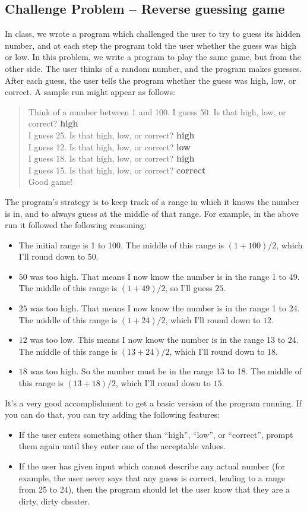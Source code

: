 \documentclass[11pt]{article}
\theoremstyle{plain}
\theoremstyle{definition}
\theoremstyle{remark}
\begin{document}
\subsection*{Challenge Problem -- Reverse guessing game}
In class, we wrote a program which challenged the user to try to guess its
hidden number, and at each step the program told the user whether the guess was
high or low. In this problem, we write a program to play the same game, but from
the other side. The user thinks of a random number, and the program makes
guesses. After each guess, the user tells the program whether the guess was
high, low, or correct. A sample run might appear as follows:
\begin{quote}
  Think of a number between 1 and 100.
  I guess 50. Is that high, low, or correct? \textbf{high} \\
  I guess 25. Is that high, low, or correct? \textbf{high} \\
  I guess 12. Is that high, low, or correct? \textbf{low} \\
  I guess 18. Is that high, low, or correct? \textbf{high} \\
  I guess 15. Is that high, low, or correct? \textbf{correct} \\
  Good game!
\end{quote}
The program's strategy is to keep track of a range in which it knows the number
is in, and to always guess at the middle of that range. For example, in the
above run it followed the following reasoning:
\begin{itemize}
  \item The initial range is 1 to 100. The middle of this range is $(1 + 100) /
    2$, which I'll round down to $50$.
  \item $50$ was too high. That means I now know the number is in the range 1 to
    49. The middle of this range is $(1 + 49) / 2$, so I'll guess $25$.
  \item $25$ was too high. That means I now know the number is in the range 1 to
    24. The middle of this range is $(1 + 24) / 2$, which I'll round down to
    $12$.
  \item $12$ was too low. This means I now know the number is in the range 13 to
    24. The middle of this range is $(13 + 24) / 2$, which I'll round down to
    $18$.
  \item $18$ was too high. So the number must be in the range 13 to 18. The
    middle of this range is $(13 + 18) / 2$, which I'll round down to $15$.
\end{itemize}
It's a very good  accomplishment to get a basic version of the program running.
If you can do that, you can try adding the following features:
\begin{itemize}
  \item If the user enters something other than ``high'', ``low'', or
    ``correct'', prompt them again until they enter one of the acceptable
    values.
  \item If the user has given input which cannot describe any actual number (for
    example, the user never says that any guess is correct, leading to a range
    from 25 to 24), then the program should let the user know that they are a
    dirty, dirty cheater.
\end{itemize}
\end{document}
